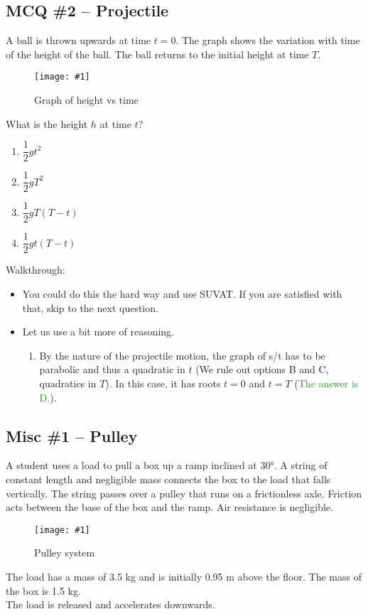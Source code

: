 \documentclass[a4paper,12pt]{article}
\newcommand{\lb}{\\[8pt]}
\newcommand{\img}[4]{\begin{center}
  \begin{figure}[H]
    \centering
    \texttt{[image: \#1]}
    \caption{#3}
    \label{fig:#4}
  \end{figure}
\end{center}}
\newcommand{\ans}[1]{\textcolor{ForestGreen}{The answer is #1.}}
\newcommand{\outs}[2]{\textcolor{BrickRed}{We rule out options #1 and #2}}
\begin{document}
\pagebreak

\subsection{MCQ \#2 -- Projectile}
A ball is thrown upwards at time $t = 0$. The graph shows the variation with time of the height of the ball. The ball returns to the initial height at time $T$.
\img{ex/1.png}{0.7}{Graph of height vs time}{heightvtime}
What is the height $h$ at time $t$?

\begin{enumerate}[label=\Alph*.]
  \item $\dfrac{1}{2}gt^2$
  \item $\dfrac{1}{2}gT^2$
  \item $\dfrac{1}{2}gT(T - t)$
  \item $\dfrac{1}{2}gt(T - t)$
\end{enumerate}

Walkthrough:
\begin{itemize}
  \item You could do this the hard way and use SUVAT. If you are satisfied with that, skip to the next question.
  \item Let us use a bit more of reasoning.
        \begin{enumerate}
          \item By the nature of the projectile motion, the graph of s/t has to be parabolic and thus a quadratic in $t$ (\outs{B}{C}, quadratics in $T$). In this case, it has roots $t = 0$ and $t = T$ (\ans{D}).

        \end{enumerate}
\end{itemize}

\pagebreak

\subsection{Misc \#1 -- Pulley}

A student uses a load to pull a box up a ramp inclined at 30°. A string of constant length and negligible mass connects the box to the load that falls vertically. The string passes over a pulley that runs on a frictionless axle. Friction acts between the base of the box and the ramp. Air resistance is negligible.

\img{ex/2.png}{0.7}{Pulley system}{pulley}

The load has a mass of 3.5 kg and is initially 0.95 m above the floor. The mass of the box is 1.5 kg.\lb
The load is released and accelerates downwards.
\end{document}
